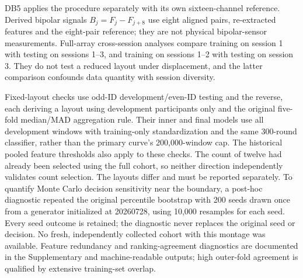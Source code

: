DB5 applies the procedure separately with its own sixteen-channel reference. Derived bipolar signals $B_j=F_j-F_{j+8}$ use eight aligned pairs, re-extracted features and the eight-pair reference; they are not physical bipolar-sensor measurements. Full-array cross-session analyses compare training on session 1 with testing on sessions 1--3, and training on sessions 1--2 with testing on session 3. They do not test a reduced layout under displacement, and the latter comparison confounds data quantity with session diversity.

Fixed-layout checks use odd-ID development/even-ID testing and the reverse, each deriving a layout using development participants only and the original five-fold median/MAD aggregation rule. Their inner and final models use all development windows with training-only standardization and the same 300-round classifier, rather than the primary curve's 200,000-window cap. The historical pooled feature thresholds also apply to these checks. The count of twelve had already been selected using the full cohort, so neither direction independently validates count selection. The layouts differ and must be reported separately. To quantify Monte Carlo decision sensitivity near the boundary, a post-hoc diagnostic repeated the original percentile bootstrap with 200 seeds drawn once from a generator initialized at 20260728, using 10,000 resamples for each seed. Every seed outcome is retained; the diagnostic never replaces the original seed or decision. No fresh, independently collected cohort with this montage was available. Feature redundancy and ranking-agreement diagnostics are documented in the Supplementary and machine-readable outputs; high outer-fold agreement is qualified by extensive training-set overlap.

